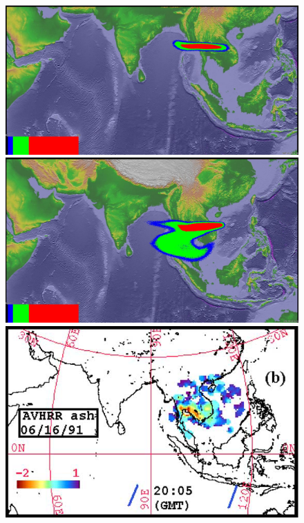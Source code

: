 \begin{figure}[!htb]
\begin{minipage}{.325 \textwidth}
    \end{minipage}%
    \\
        \begin{minipage}{.325\textwidth}
        \centering
        \includegraphics[width=0.99 \textwidth]{Chapter-7/Figures/bent-31hr-ash}
    \end{minipage}%
    \begin{minipage}{.325 \textwidth}
        \centering
        \includegraphics[width=0.99 \textwidth]{Chapter-7/Figures/SPH-Plume-31hr-ash}
    \end{minipage}%
    \begin{minipage}{.325 \textwidth}
        \centering
        \includegraphics[width=0.99 \textwidth]{Chapter-7/Figures/OB-ash-31hr-ash}

\end{minipage}
\end{figure}
